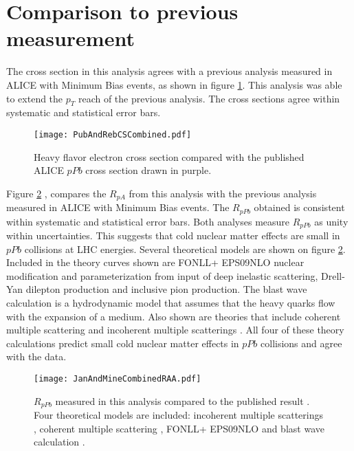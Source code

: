 




\section{Comparison to previous measurement}

The cross section in this analysis agrees with a previous analysis \cite{Adam:2015qda} measured in ALICE with Minimum Bias events, as shown in figure \ref{fig:PubAndRebCSCombined}. This analysis was able to extend the $p_{T}$ reach of the previous analysis. The cross sections agree within systematic and statistical error bars. 

\begin{figure}[h!]
  \centering
  \texttt{[image: PubAndRebCSCombined.pdf]}\\
  \caption{Heavy flavor electron cross section compared with the published \cite{Adam:2015qda} ALICE $pPb$ cross section drawn in purple.} \label{fig:PubAndRebCSCombined}
\end{figure}





Figure \ref{fig:RebeccaAndJanRAA} \cite{Adam:2016wyz}, compares the $R_{pA}$ from this analysis with the previous analysis \cite{Adam:2015qda} measured in ALICE with Minimum Bias events. The $R_{pPb}$ obtained is consistent within systematic and statistical error bars. Both analyses measure $R_{pPb}$ as unity within uncertainties. This suggests that cold nuclear matter effects are small in $pPb$ collisions at LHC energies. Several theoretical models are shown on figure \ref{fig:RebeccaAndJanRAA}. Included in the theory curves shown are FONLL+ EPS09NLO \cite{Eskola:NewGeneration} nuclear modification and parameterization from input of deep inelastic scattering, Drell-Yan dilepton production and inclusive pion production. The blast wave calculation \cite{Sickles:2013yna} is a hydrodynamic model that assumes that the heavy quarks flow with the expansion of a medium. Also shown are theories that include coherent multiple scattering \cite{Sharma:2009hn} and incoherent multiple scatterings \cite{Kang:2014hha}. All four of these theory calculations predict small cold nuclear matter effects in $pPb$ collisions and agree with the data. 

\begin{figure}[h]
  \centering
  \texttt{[image: JanAndMineCombinedRAA.pdf]}\\
  \caption{$R_{pPb}$ measured in this analysis compared to the published result \cite{Adam:2015qda}. Four theoretical models are included: incoherent multiple scatterings \cite{Kang:2014hha}, coherent multiple scattering \cite{Sharma:2009hn}, FONLL+ EPS09NLO \cite{Eskola:NewGeneration} and blast wave calculation \cite{Sickles:2013yna}.} \label{fig:RebeccaAndJanRAA}
\end{figure}






